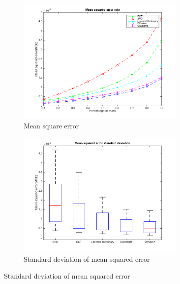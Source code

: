 \begin{figure}
	\begin{subfigure}[b]{0.48\textwidth}
		\centering
		\includegraphics[trim=1.4cm 0.5cm 1.5cm 0.5cm, clip, width=0.9\textwidth]{figures/mse}
		\caption{Mean square error }
		\label{fig:mse}
	\end{subfigure}
	\begin{subfigure}[b]{0.48\textwidth}
		\centering
		\includegraphics[trim=1.4cm 0.5cm 1.5cm 0.5cm, clip, width=0.9\textwidth]{figures/mse_std}
		\caption{Standard deviation of mean squared error}
		\label{fig:mse_std}	
	\end{subfigure}
\end{figure}


\begin{figure}
		
\end{figure}